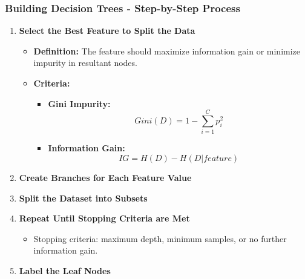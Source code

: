 \documentclass[aspectratio=169]{beamer}
\begin{document}
\begin{frame}[fragile]
    \frametitle{Building Decision Trees - Step-by-Step Process}
    \begin{enumerate}
        \item \textbf{Select the Best Feature to Split the Data}
            \begin{itemize}
                \item \textbf{Definition:} The feature should maximize information gain or minimize impurity in resultant nodes.
                \item \textbf{Criteria:} 
                    \begin{itemize}
                        \item \textbf{Gini Impurity:}
                        \[
                        Gini(D) = 1 - \sum_{i=1}^{C} p_i^2
                        \]
                        \item \textbf{Information Gain:}
                        \[
                        IG = H(D) - H(D|feature)
                        \]
                    \end{itemize}
            \end{itemize}
            
        \item \textbf{Create Branches for Each Feature Value}
        \item \textbf{Split the Dataset into Subsets}
        \item \textbf{Repeat Until Stopping Criteria are Met}
            \begin{itemize}
                \item Stopping criteria: maximum depth, minimum samples, or no further information gain.
            \end{itemize}
        \item \textbf{Label the Leaf Nodes}
    \end{enumerate}
\end{frame}
\end{document}
